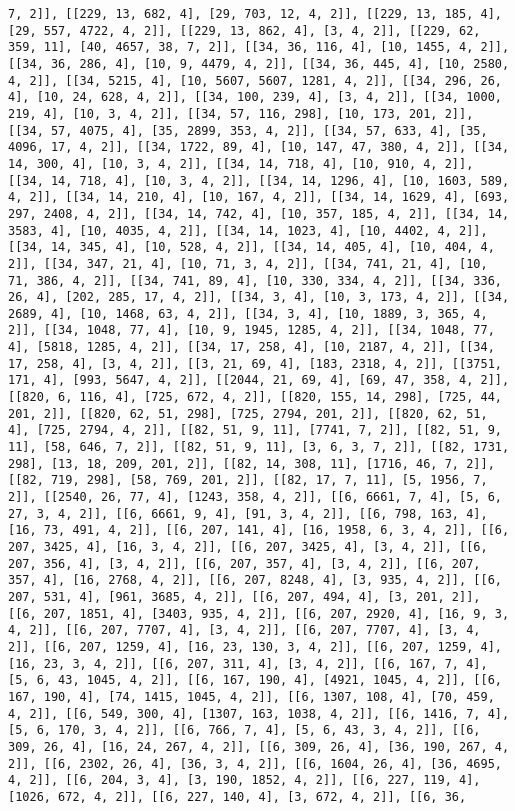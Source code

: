\documentclass[12pt,fleqn]{article}\usepackage{../../common}
\begin{document}
\begin{verbatim}
7, 2]], [[229, 13, 682, 4], [29, 703, 12, 4, 2]], [[229, 13, 185, 4], [29, 557, 4722, 4, 2]], [[229, 13, 862, 4], [3, 4, 2]], [[229, 62, 359, 11], [40, 4657, 38, 7, 2]], [[34, 36, 116, 4], [10, 1455, 4, 2]], [[34, 36, 286, 4], [10, 9, 4479, 4, 2]], [[34, 36, 445, 4], [10, 2580, 4, 2]], [[34, 5215, 4], [10, 5607, 5607, 1281, 4, 2]], [[34, 296, 26, 4], [10, 24, 628, 4, 2]], [[34, 100, 239, 4], [3, 4, 2]], [[34, 1000, 219, 4], [10, 3, 4, 2]], [[34, 57, 116, 298], [10, 173, 201, 2]], [[34, 57, 4075, 4], [35, 2899, 353, 4, 2]], [[34, 57, 633, 4], [35, 4096, 17, 4, 2]], [[34, 1722, 89, 4], [10, 147, 47, 380, 4, 2]], [[34, 14, 300, 4], [10, 3, 4, 2]], [[34, 14, 718, 4], [10, 910, 4, 2]], [[34, 14, 718, 4], [10, 3, 4, 2]], [[34, 14, 1296, 4], [10, 1603, 589, 4, 2]], [[34, 14, 210, 4], [10, 167, 4, 2]], [[34, 14, 1629, 4], [693, 297, 2408, 4, 2]], [[34, 14, 742, 4], [10, 357, 185, 4, 2]], [[34, 14, 3583, 4], [10, 4035, 4, 2]], [[34, 14, 1023, 4], [10, 4402, 4, 2]], [[34, 14, 345, 4], [10, 528, 4, 2]], [[34, 14, 405, 4], [10, 404, 4, 2]], [[34, 347, 21, 4], [10, 71, 3, 4, 2]], [[34, 741, 21, 4], [10, 71, 386, 4, 2]], [[34, 741, 89, 4], [10, 330, 334, 4, 2]], [[34, 336, 26, 4], [202, 285, 17, 4, 2]], [[34, 3, 4], [10, 3, 173, 4, 2]], [[34, 2689, 4], [10, 1468, 63, 4, 2]], [[34, 3, 4], [10, 1889, 3, 365, 4, 2]], [[34, 1048, 77, 4], [10, 9, 1945, 1285, 4, 2]], [[34, 1048, 77, 4], [5818, 1285, 4, 2]], [[34, 17, 258, 4], [10, 2187, 4, 2]], [[34, 17, 258, 4], [3, 4, 2]], [[3, 21, 69, 4], [183, 2318, 4, 2]], [[3751, 171, 4], [993, 5647, 4, 2]], [[2044, 21, 69, 4], [69, 47, 358, 4, 2]], [[820, 6, 116, 4], [725, 672, 4, 2]], [[820, 155, 14, 298], [725, 44, 201, 2]], [[820, 62, 51, 298], [725, 2794, 201, 2]], [[820, 62, 51, 4], [725, 2794, 4, 2]], [[82, 51, 9, 11], [7741, 7, 2]], [[82, 51, 9, 11], [58, 646, 7, 2]], [[82, 51, 9, 11], [3, 6, 3, 7, 2]], [[82, 1731, 298], [13, 18, 209, 201, 2]], [[82, 14, 308, 11], [1716, 46, 7, 2]], [[82, 719, 298], [58, 769, 201, 2]], [[82, 17, 7, 11], [5, 1956, 7, 2]], [[2540, 26, 77, 4], [1243, 358, 4, 2]], [[6, 6661, 7, 4], [5, 6, 27, 3, 4, 2]], [[6, 6661, 9, 4], [91, 3, 4, 2]], [[6, 798, 163, 4], [16, 73, 491, 4, 2]], [[6, 207, 141, 4], [16, 1958, 6, 3, 4, 2]], [[6, 207, 3425, 4], [16, 3, 4, 2]], [[6, 207, 3425, 4], [3, 4, 2]], [[6, 207, 356, 4], [3, 4, 2]], [[6, 207, 357, 4], [3, 4, 2]], [[6, 207, 357, 4], [16, 2768, 4, 2]], [[6, 207, 8248, 4], [3, 935, 4, 2]], [[6, 207, 531, 4], [961, 3685, 4, 2]], [[6, 207, 494, 4], [3, 201, 2]], [[6, 207, 1851, 4], [3403, 935, 4, 2]], [[6, 207, 2920, 4], [16, 9, 3, 4, 2]], [[6, 207, 7707, 4], [3, 4, 2]], [[6, 207, 7707, 4], [3, 4, 2]], [[6, 207, 1259, 4], [16, 23, 130, 3, 4, 2]], [[6, 207, 1259, 4], [16, 23, 3, 4, 2]], [[6, 207, 311, 4], [3, 4, 2]], [[6, 167, 7, 4], [5, 6, 43, 1045, 4, 2]], [[6, 167, 190, 4], [4921, 1045, 4, 2]], [[6, 167, 190, 4], [74, 1415, 1045, 4, 2]], [[6, 1307, 108, 4], [70, 459, 4, 2]], [[6, 549, 300, 4], [1307, 163, 1038, 4, 2]], [[6, 1416, 7, 4], [5, 6, 170, 3, 4, 2]], [[6, 766, 7, 4], [5, 6, 43, 3, 4, 2]], [[6, 309, 26, 4], [16, 24, 267, 4, 2]], [[6, 309, 26, 4], [36, 190, 267, 4, 2]], [[6, 2302, 26, 4], [36, 3, 4, 2]], [[6, 1604, 26, 4], [36, 4695, 4, 2]], [[6, 204, 3, 4], [3, 190, 1852, 4, 2]], [[6, 227, 119, 4], [1026, 672, 4, 2]], [[6, 227, 140, 4], [3, 672, 4, 2]], [[6, 36, 
\end{verbatim}
\end{document}
